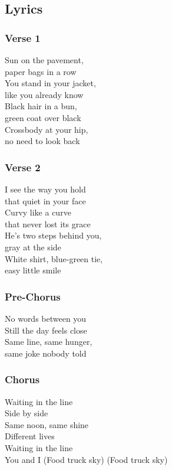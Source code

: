 \subsection{Lyrics}\label{lyrics-5}

\subsubsection{Verse 1}\label{verse-1-1}

Sun on the pavement,\\
paper bags in a row\\
You stand in your jacket,\\
like you already know\\
Black hair in a bun,\\
green coat over black\\
Crossbody at your hip,\\
no need to look back

\subsubsection{Verse 2}\label{verse-2-1}

I see the way you hold\\
that quiet in your face\\
Curvy like a curve\\
that never lost its grace\\
He's two steps behind you,\\
gray at the side\\
White shirt, blue-green tie,\\
easy little smile

\subsubsection{Pre-Chorus}\label{pre-chorus}

No words between you\\
Still the day feels close\\
Same line, same hunger,\\
same joke nobody told

\subsubsection{Chorus}\label{chorus-7}

Waiting in the line\\
Side by side\\
Same noon, same shine\\
Different lives\\
Waiting in the line\\
You and I (Food truck sky) (Food truck sky)

